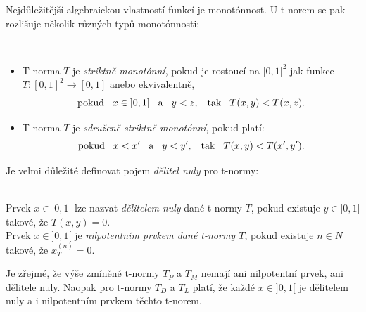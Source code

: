     Nejd\r uležitější algebraickou vlastností funkcí je monot\' onnost. U t-norem se pak rozlišuje několik r\r uzných typ\r u monot\' onnosti:
    \begin{definition}
    \cite{KMP}\\
        \begin{itemize}
            \item T-norma $T$ je {\em striktně
            monot\' onní}, pokud
            je rostoucí na $]0,1]^2$ jak funkce $ T:[0,1]^2 \rightarrow [0,1]$ anebo
            ekvivalentně,
            $$ \text {pokud} \hskip 3mm x \in \hskip 1mm ]0,1] \hskip 3mm \text{a} \hskip 3mm y < z, \hskip 3mm \text {tak} \hskip 3mm T(x,y) < T(x,z). $$
            \item  T-norma $T$ je {\em sdruženě striktně
            monot\' onní}, pokud platí:
            $$ \text{pokud} \hskip 3mm  x < x'\hskip 3mm \text{a} \hskip 3mm y<y',
            \hskip 3mm  \text{tak} \hskip 3mm   T(x,y)<T(x',y').$$
            \end{itemize}
    \end{definition}

    Je velmi d\r uležité definovat pojem \textit{dělitel nuly} pro t-normy:
    \begin{definition}
        \cite{KMP}\\
        Prvek $x \in ]0,1[$ lze nazvat {\em dělitelem nuly} dané t-normy $T$, pokud
        existuje $y \in ]0,1[$ takové, že $T(x,y) = 0.$\\
        Prvek $x \in ]0,1[$ je {\em nilpotentním prvkem dané t-normy $T$}, pokud existuje $n \in N$ takové,
        že $ x_T^{(n)} =0.$
    \end{definition}

    \begin{example}
        Je zřejmé, že výše zmíněné t-normy $T_P$ a $T_M$ nemají ani nilpotentní prvek, ani dělitele nuly. Naopak pro t-normy $T_D$ a $T_L$ platí, že každé $x \in ]0,1[$ je dělitelem nuly a i nilpotentním prvkem těchto t-norem.
    \end{example}

